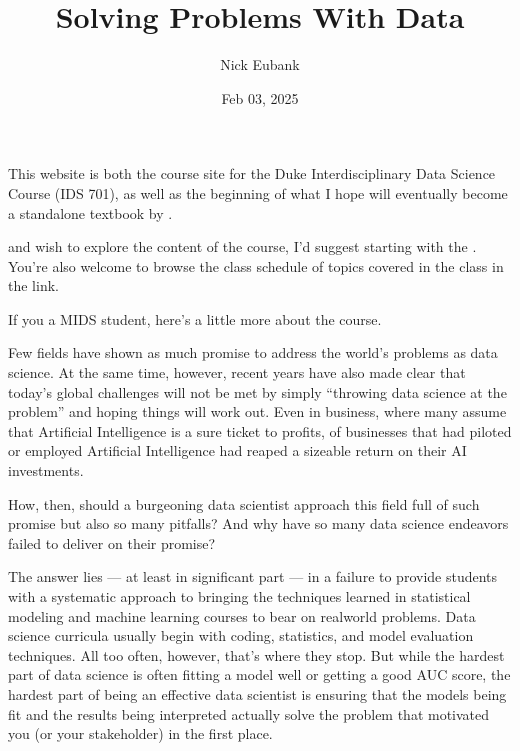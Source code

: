 \documentclass[letterpaper,10pt,english]{jupyterBook}
\title{Solving Problems With Data}
\date{Feb 03, 2025}
\author{Nick Eubank}
\begin{document}
\pagestyle{empty}
\sphinxmaketitle
\pagestyle{plain}
\sphinxtableofcontents
\pagestyle{normal}
\label{\detokenize{landing_page::doc}}


\sphinxAtStartPar
This website is both the course site for the Duke Interdisciplinary Data Science Course  (IDS 701), as well as the beginning of what I hope will eventually become a stand\sphinxhyphen{}alone textbook by .

\sphinxAtStartPar
{} and wish to explore the content of the course, I’d suggest starting with the {\hyperref[\detokenize{10_introduction/10_solving_problems_with_data::doc}]{}}. You’re also welcome to browse the class schedule of topics covered in the class in the {\hyperref[\detokenize{00_class_schedule/class_schedule::doc}]{}} link.

\sphinxAtStartPar
If you  a MIDS student, here’s a little more about the course.

\begin{DUlineblock}{0em}
\item[] 
\end{DUlineblock}

\sphinxAtStartPar
Few fields have shown as much promise to address the world’s problems as data science. At the same time, however, recent years have also made clear that today’s global challenges will not be met by simply “throwing data science at the problem” and hoping things will work out. Even in business, where many assume that Artificial Intelligence is a sure ticket to profits,  of businesses that had piloted or employed Artificial Intelligence had reaped a sizeable return on their AI investments.

\sphinxAtStartPar
How, then, should a burgeoning data scientist approach this field full of such promise but also so many pitfalls? And why have so many data science endeavors failed to deliver on their promise?

\sphinxAtStartPar
The answer lies — at least in significant part — in a failure to provide students with a systematic approach to bringing the techniques learned in statistical modeling and machine learning courses to bear on real\sphinxhyphen{}world problems. Data science curricula usually begin with coding, statistics, and model evaluation techniques. All too often, however, that’s where they stop. But while the hardest part of data science  is often fitting a model well or getting a good AUC score, the hardest part of being an effective  data scientist is ensuring that the models being fit and the results being interpreted actually solve the problem that motivated you (or your stakeholder) in the first place.
\end{document}
